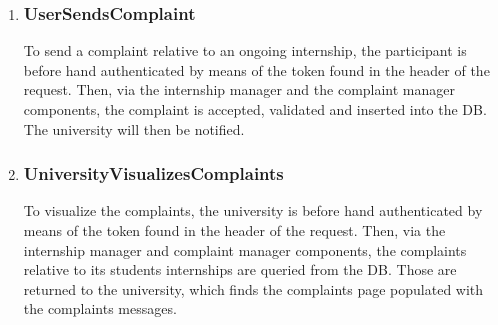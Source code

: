 \begin{enumerate}[label=\textbf{RV\arabic* -}]
\item \subsubsection{UserSendsComplaint}

To send a complaint relative to an ongoing internship, the participant is before hand authenticated by means of the token found in the header of the request.
Then, via the internship manager and the complaint manager components, the complaint is accepted, validated and inserted into the DB.
The university will then be notified.

\begin{figure}[H]
    \centering
\end{figure}

\item \subsubsection{UniversityVisualizesComplaints}

To visualize the complaints, the university is before hand authenticated by means of the token found in the header of the request.
Then, via the internship manager and complaint manager components, the complaints relative to its students internships are queried from the DB.
Those are returned to the university, which finds the complaints page populated with the complaints messages.

\begin{figure}[H]
    \centering
\end{figure}


\end{enumerate}

